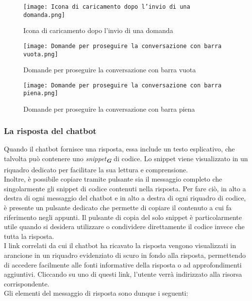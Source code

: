 \newpage

\begin{figure}[h]
    \centering
        \texttt{[image: Icona di caricamento dopo l'invio di una domanda.png]}
        \caption{Icona di caricamento dopo l'invio di una domanda}
        \label{fig:Icona di caricamento dopo l'invio di una domanda}
\end{figure}
\begin{figure}[h]
    \centering
        \texttt{[image: Domande per proseguire la conversazione con barra vuota.png]}
        \caption{Domande per proseguire la conversazione con barra vuota}
        \label{fig:Domande per proseguire la conversazione con barra vuota}        
\end{figure}
\begin{figure}[h]
    \centering
        \texttt{[image: Domande per proseguire la conversazione con barra piena.png]}
        \caption{Domande per proseguire la conversazione con barra piena}
        \label{fig:Domande per proseguire la conversazione con barra piena}        
\end{figure}


 
\subsubsection{La risposta del chatbot}  
\label{subsec:la_risposta_del_chatbot}  

Quando il chatbot fornisce una risposta, essa include un testo esplicativo, che talvolta può contenere uno \emph{snippet}\textsubscript{\textbf{\textit{G}}} di codice. Lo snippet viene visualizzato in un riquadro dedicato per facilitare la sua lettura e comprensione.\\
Inoltre, è possibile copiare tramite pulsante sia il messaggio completo che singolarmente gli snippet di codice contenuti nella risposta. Per fare ciò, in alto a destra di ogni messaggio del chatbot e in alto a destra di ogni riquadro di codice, è presente un pulsante dedicato che permette di copiare il contenuto a cui fa riferimento negli appunti. Il pulsante di copia del solo snippet è particolarmente utile quando si desidera utilizzare o condividere direttamente il codice invece che tutta la risposta.\\
I link correlati da cui il chatbot ha ricavato la risposta vengono visualizzati in arancione in un riquadro evidenziato di scuro in fondo alla risposta, permettendo di accedere facilmente alle fonti informative della risposta o ad approfondimenti aggiuntivi. Cliccando su uno di questi link, l'utente verrà indirizzato alla risorsa corrispondente.\\
Gli elementi del messaggio di risposta sono dunque i seguenti:

